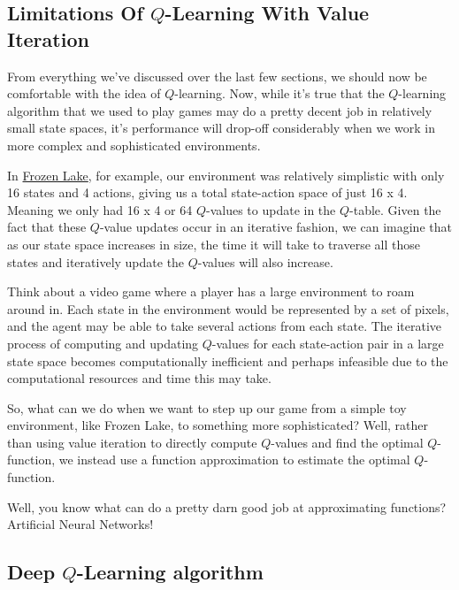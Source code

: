 \subsection{Limitations Of $Q$-Learning With Value Iteration}

From everything we've discussed over the last few sections, we should now be comfortable 
with the idea of $Q$-learning. Now, while it's true that the $Q$-learning algorithm that 
we used to play games may do a pretty decent job in relatively small state spaces, it's 
performance will drop-off considerably when we work in more complex and sophisticated 
environments.

In \href{https://deeplizard.com/learn/video/QK_PP_2KgGE}{Frozen Lake}, for example, our 
environment was relatively simplistic with only 16 states and 4 actions, giving us a 
total state-action space of just 16 x 4. Meaning we only had 16 x 4 or 64 $Q$-values to 
update in the $Q$-table. Given the fact that these $Q$-value updates occur in an iterative 
fashion, we can imagine that as our state space increases in size, the time it will take 
to traverse all those states and iteratively update the $Q$-values will also increase.

Think about a video game where a player has a large environment to roam around in. Each 
state in the environment would be represented by a set of pixels, and the agent may be 
able to take several actions from each state. The iterative process of computing and 
updating $Q$-values for each state-action pair in a large state space becomes 
computationally inefficient and perhaps infeasible due to the computational resources 
and time this may take.

So, what can we do when we want to step up our game from a simple toy environment, like 
Frozen Lake, to something more sophisticated? Well, rather than using value iteration to 
directly compute $Q$-values and find the optimal $Q$-function, we instead use a function 
approximation to estimate the optimal $Q$-function.

Well, you know what can do a pretty darn good job at approximating functions? Artificial 
Neural Networks!


\subsection{Deep $Q$-Learning algorithm}


